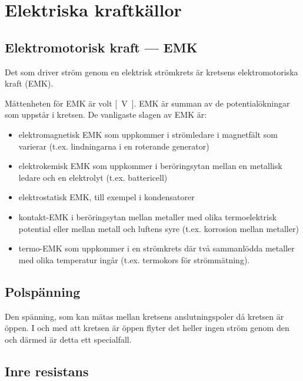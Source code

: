 \section{Elektriska kraftkällor}

\subsection{Elektromotorisk kraft --- EMK}

Det som driver ström genom en elektrisk strömkrets är kretsens elektromotoriska
kraft (EMK).

Måttenheten för EMK är \unit{volt} \unit{[V]}. EMK är summan av de
potentialökningar som uppstår i kretsen. De vanligaste slagen av EMK är:

\begin{itemize}
\item elektromagnetisk EMK som uppkommer i strömledare i magnetfält som
varierar (t.ex. lindningarna i en roterande generator)
\item elektrokemisk EMK som uppkommer i beröringsytan mellan en metallisk
ledare och en elektrolyt (t.ex. battericell)
\item elektrostatisk EMK, till exempel i kondensatorer
\item kontakt-EMK i beröringsytan mellan metaller med olika termoelektrisk
potential eller mellan metall och luftens syre (t.ex. korrosion mellan metaller)
\item termo-EMK som uppkommer i en strömkrets där två sammanlödda metaller med
olika temperatur ingår (t.ex. termokors för strömmätning).
\end{itemize}

\subsection{Polspänning}

Den spänning, som kan mätas mellan kretsens anslutningspoler då kretsen är öppen. 
I och med att kretsen är öppen flyter det heller ingen ström genom den och därmed 
är detta ett specialfall.

\subsection{Inre resistans}

